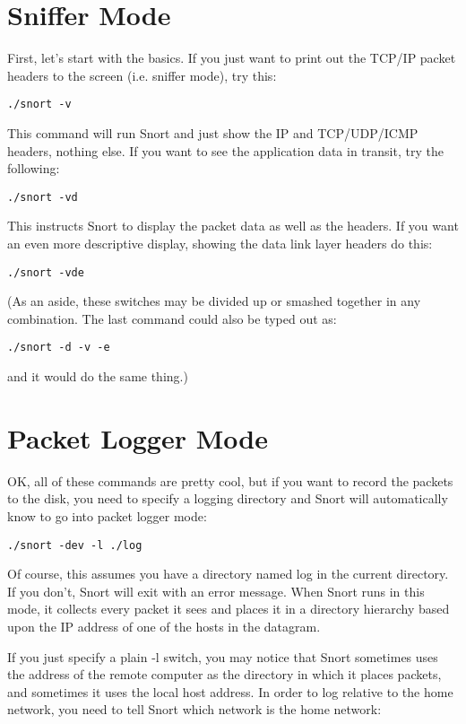 \documentclass[english]{report}
\begin{document}
\section{Sniffer Mode}

First, let's start with the basics. If you just want to print out
the TCP/IP packet headers to the screen (i.e. sniffer mode), try this:

\begin{verbatim}
./snort -v
\end{verbatim}
This command will run Snort and just show the IP and TCP/UDP/ICMP
headers, nothing else. If you want to see the application data in
transit, try the following:

\begin{verbatim}
./snort -vd
\end{verbatim}
This instructs Snort to display the packet data as well as the headers.
If you want an even more descriptive display, showing the data link
layer headers do this:

\begin{verbatim}
./snort -vde
\end{verbatim}
(As an aside, these switches may be divided up or smashed together
in any combination. The last command could also be typed out as:

\begin{verbatim}
./snort -d -v -e
\end{verbatim}
and it would do the same thing.)


\section{Packet Logger Mode}

OK, all of these commands are pretty cool, but if you want to record
the packets to the disk, you need to specify a logging directory and
Snort will automatically know to go into packet logger mode:

\begin{verbatim}
./snort -dev -l ./log
\end{verbatim}
Of course, this assumes you have a directory named log
in the current directory. If you don't, Snort will exit with an error
message. When Snort runs in this mode, it collects every packet it
sees and places it in a directory hierarchy based upon the IP address
of one of the hosts in the datagram.

If you just specify a plain -l switch, you may
notice that Snort sometimes uses the address of the remote computer
as the directory in which it places packets, and sometimes it uses
the local host address. In order to log relative to the home network,
you need to tell Snort which network is the home network:
\end{document}
